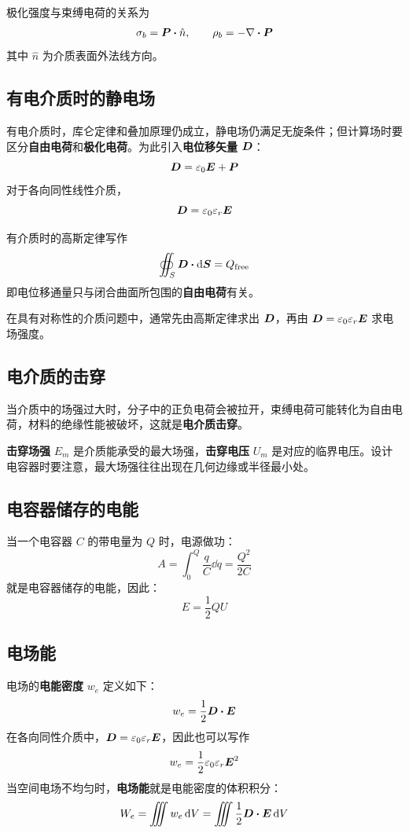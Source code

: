 极化强度与束缚电荷的关系为
$$
\sigma_b = \vect{P} \vdot \hat{n}, \qquad \rho_b = - \nabla \vdot \vect{P}
$$
其中 $\hat{n}$ 为介质表面外法线方向。

\subsection{有电介质时的静电场}

有电介质时，库仑定律和叠加原理仍成立，静电场仍满足无旋条件；但计算场时要区分\textbf{自由电荷}和\textbf{极化电荷}。为此引入\textbf{电位移矢量} $\boldsymbol{D}$：
$$
\boldsymbol{D} = \varepsilon_0 \boldsymbol{E} + \boldsymbol{P}
$$
对于各向同性线性介质，
$$
\boldsymbol{D} = \varepsilon_0 \varepsilon_r \boldsymbol{E}
$$

有介质时的高斯定律写作
$$
\oiint_S \vect{D} \vdot \dd{\vect{S}} = Q_{\text{free}}
$$
即电位移通量只与闭合曲面所包围的\textbf{自由电荷}有关。

在具有对称性的介质问题中，通常先由高斯定律求出 $\boldsymbol{D}$，再由 $\boldsymbol{D} = \varepsilon_0 \varepsilon_r \boldsymbol{E}$ 求电场强度。

\subsection{电介质的击穿}

当介质中的场强过大时，分子中的正负电荷会被拉开，束缚电荷可能转化为自由电荷，材料的绝缘性能被破坏，这就是\textbf{电介质击穿}。

\textbf{击穿场强} $E_m$ 是介质能承受的最大场强，\textbf{击穿电压} $U_m$ 是对应的临界电压。设计电容器时要注意，最大场强往往出现在几何边缘或半径最小处。

\subsection{电容器储存的电能}

当一个电容器 $C$ 的带电量为 $Q$ 时，电源做功：
$$
A = \int_0^Q \frac{q}{C} \dd{q} = \frac{Q^2}{2 C}
$$
就是电容器储存的电能，因此：
$$
E = \frac{1}{2} Q U
$$

\subsection{电场能}

电场的\textbf{电能密度} $w_e$ 定义如下：
$$
w_e = \frac{1}{2} \vect{D} \vdot \vect{E}
$$
在各向同性介质中，$\boldsymbol{D} = \varepsilon_0 \varepsilon_r \boldsymbol{E}$，因此也可以写作
$$
w_e = \frac{1}{2} \varepsilon_0 \varepsilon_r \boldsymbol{E}^2
$$
当空间电场不均匀时，\textbf{电场能}就是电能密度的体积积分：
$$
W_e = \iiint w_e \dd{V} = \iiint \frac{1}{2} \vect{D} \vdot \vect{E} \dd{V}
$$

